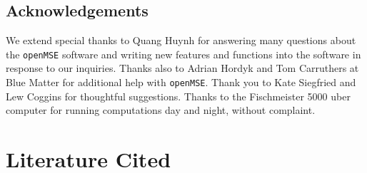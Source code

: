 \documentclass[12pt,english]{article}
\begin{document}
\begin{flushleft}
\begin{spacing}{1.9}



\section*{Acknowledgements}
We extend special thanks to Quang Huynh for answering many questions about the \texttt{openMSE} software and writing new features and functions into the software in response to our inquiries. Thanks also to Adrian Hordyk and Tom Carruthers at Blue Matter for additional help with \texttt{openMSE}. Thank you to Kate Siegfried and Lew Coggins for thoughtful suggestions. Thanks to the Fischmeister 5000 uber computer for running computations day and night, without complaint.

\end{spacing}
\end{flushleft}

\clearpage
\section*{Literature Cited}
\renewcommand{\refname}{}
\vspace{-1cm}




\end{document}
